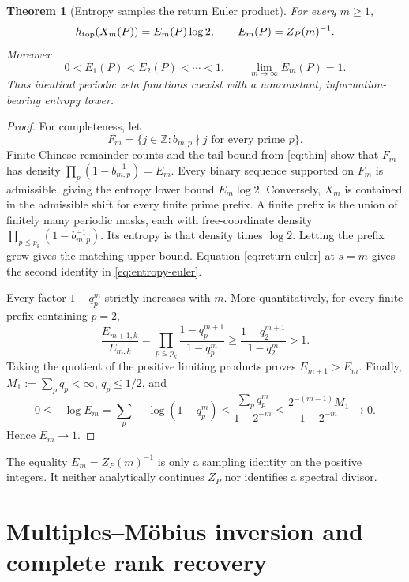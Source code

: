\documentclass[11pt]{article}
\numberwithin{equation}{section}
\newtheorem{theorem}{Theorem}[section]
\theoremstyle{remark}
\newcommand{\Z}{\mathbb Z}
\begin{document}
\begin{theorem}[Entropy samples the return Euler product]
\label{thm:entropy}
For every $m\ge1$,
\begin{equation}
 h_{\rm top}(X_m(P))=E_m(P)\log2,
 \qquad
 E_m(P)=Z_P(m)^{-1}.
 \label{eq:entropy-euler}
\end{equation}
Moreover
\begin{equation}
 0<E_1(P)<E_2(P)<\cdots<1,
 \qquad
 \lim_{m\to\infty}E_m(P)=1.
 \label{eq:entropy-monotone}
\end{equation}
Thus identical periodic zeta functions coexist with a nonconstant,
information-bearing entropy tower.
\end{theorem}

\begin{proof}
For completeness, let
\[
 F_m=\{j\in\Z:b_{m,p}\nmid j\text{ for every prime }p\}.
\]
Finite Chinese-remainder counts and the tail bound from
\eqref{eq:thin} show that $F_m$ has density
\(
\prod_p(1-b_{m,p}^{-1})=E_m
\).
Every binary sequence supported on $F_m$ is admissible, giving the entropy
lower bound $E_m\log2$.  Conversely, $X_m$ is contained in the
admissible shift for every finite prime prefix.  A finite prefix is the
union of finitely many periodic masks, each with free-coordinate density
\(
\prod_{p\le p_k}(1-b_{m,p}^{-1})
\).
Its entropy is that density times $\log2$.  Letting the prefix grow gives
the matching upper bound.  Equation \eqref{eq:return-euler} at $s=m$
gives the second identity in \eqref{eq:entropy-euler}.

Every factor $1-q_p^m$ strictly increases with $m$.  More quantitatively,
for every finite prefix containing $p=2$,
\[
 \frac{E_{m+1,k}}{E_{m,k}}
 =\prod_{p\le p_k}\frac{1-q_p^{m+1}}{1-q_p^m}
 \ge\frac{1-q_2^{m+1}}{1-q_2^m}>1.
\]
Taking the quotient of the positive limiting products proves
$E_{m+1}>E_m$.
Finally, $M_1:=\sum_p q_p<\infty$, $q_p\le1/2$, and
\[
 0\le-\log E_m
 =\sum_p-\log(1-q_p^m)
 \le \frac{\sum_p q_p^m}{1-2^{-m}}
 \le \frac{2^{-(m-1)}M_1}{1-2^{-m}}\longrightarrow0.
\]
Hence $E_m\to1$.
\end{proof}

The equality $E_m=Z_P(m)^{-1}$ is only a sampling identity on the positive
integers.  It neither analytically continues $Z_P$ nor identifies a
spectral divisor.

\section{Multiples--M\"obius inversion and complete rank recovery}
\end{document}
